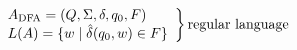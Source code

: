 \vspace{0.5em}
\[\left.
    \begin{array}{l}
    A_{\text{DFA}} = (Q,\Sigma,\delta,q_{0},F)\\
    L(A) = \{w \;|\; \hat{\delta}(q_{0},w) \in F\}
    \end{array}
    \right\} \text{regular language}
\]
